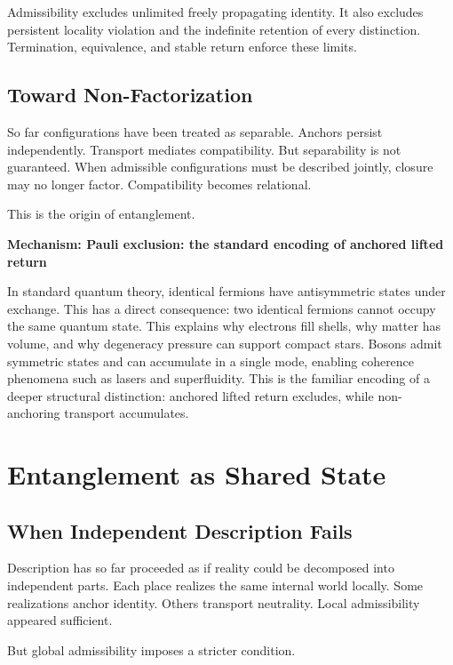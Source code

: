 \documentclass[11pt,twoside,openright]{book}
\newenvironment{mechanismbox}[1]
  {\begin{framed}\noindent\textbf{Mechanism: #1}\par\medskip}
  {\end{framed}}
\begin{document}
Admissibility excludes unlimited freely propagating identity. It also excludes persistent locality violation and the indefinite retention of every distinction. Termination, equivalence, and stable return enforce these limits.

\section*{Toward Non-Factorization}

So far configurations have been treated as separable. Anchors persist independently. Transport mediates compatibility. But separability is not guaranteed. When admissible configurations must be described jointly, closure may no longer factor. Compatibility becomes relational.

This is the origin of entanglement.

\begin{mechanismbox}{Pauli exclusion: the standard encoding of anchored lifted return}

In standard quantum theory, identical fermions have antisymmetric states under exchange. This has a direct consequence: two identical fermions cannot occupy the same quantum state. This explains why electrons fill shells, why matter has volume, and why degeneracy pressure can support compact stars. Bosons admit symmetric states and can accumulate in a single mode, enabling coherence phenomena such as lasers and superfluidity. This is the familiar encoding of a deeper structural distinction: anchored lifted return excludes, while non-anchoring transport accumulates.

\end{mechanismbox}
\chapter{Entanglement as Shared State}

\section*{When Independent Description Fails}

Description has so far proceeded as if reality could be decomposed into independent parts. Each place realizes the same internal world locally. Some realizations anchor identity. Others transport neutrality. Local admissibility appeared sufficient.

But global admissibility imposes a stricter condition.
\end{document}
